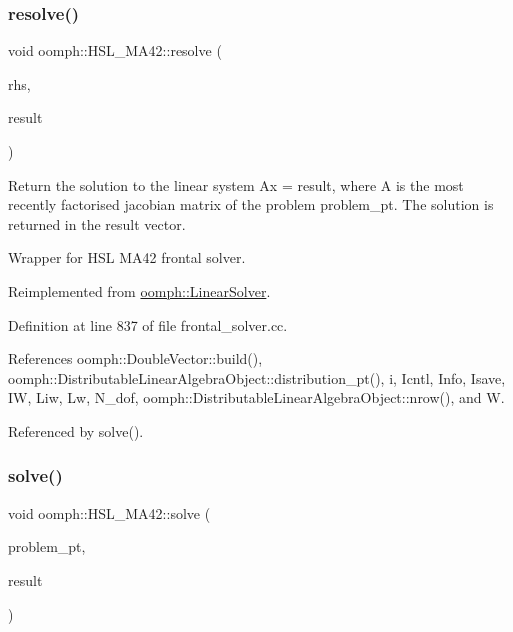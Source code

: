 \subsubsection{\texorpdfstring{resolve()}{resolve()}}
{\footnotesize\ttfamily void oomph\+::\+H\+S\+L\+\_\+\+M\+A42\+::resolve (\begin{DoxyParamCaption}\item[{const \hyperlink{classoomph_1_1DoubleVector}{Double\+Vector} \&}]{rhs,  }\item[{\hyperlink{classoomph_1_1DoubleVector}{Double\+Vector} \&}]{result }\end{DoxyParamCaption})\hspace{0.3cm}{\ttfamily [virtual]}}



Return the solution to the linear system Ax = result, where A is the most recently factorised jacobian matrix of the problem problem\+\_\+pt. The solution is returned in the result vector. 

Wrapper for H\+SL M\+A42 frontal solver. 

Reimplemented from \hyperlink{classoomph_1_1LinearSolver_a3b310d08333033edc119b2a5bd7dcbfb}{oomph\+::\+Linear\+Solver}.



Definition at line 837 of file frontal\+\_\+solver.\+cc.



References oomph\+::\+Double\+Vector\+::build(), oomph\+::\+Distributable\+Linear\+Algebra\+Object\+::distribution\+\_\+pt(), i, Icntl, Info, Isave, IW, Liw, Lw, N\+\_\+dof, oomph\+::\+Distributable\+Linear\+Algebra\+Object\+::nrow(), and W.



Referenced by solve().

\mbox{\label{classoomph_1_1HSL__MA42_ae796a6b14c13d1cdb7bf49ca3c7c5aec}} 
\subsubsection{\texorpdfstring{solve()}{solve()}\hspace{0.1cm}{\footnotesize\ttfamily [1/3]}}
{\footnotesize\ttfamily void oomph\+::\+H\+S\+L\+\_\+\+M\+A42\+::solve (\begin{DoxyParamCaption}\item[{\hyperlink{classoomph_1_1Problem}{Problem} $\ast$const \&}]{problem\+\_\+pt,  }\item[{\hyperlink{classoomph_1_1DoubleVector}{Double\+Vector} \&}]{result }\end{DoxyParamCaption})\hspace{0.3cm}{\ttfamily [virtual]}}



